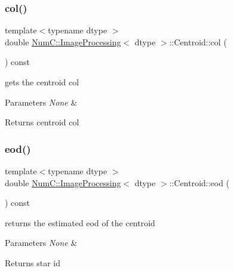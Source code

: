 \subsubsection{\texorpdfstring{col()}{col()}}
{\footnotesize\ttfamily template$<$typename dtype $>$ \\
double \mbox{\hyperlink{class_num_c_1_1_image_processing}{Num\+C\+::\+Image\+Processing}}$<$ dtype $>$\+::Centroid\+::col (\begin{DoxyParamCaption}{ }\end{DoxyParamCaption}) const\hspace{0.3cm}{\ttfamily [inline]}}

gets the centroid col


\begin{DoxyParams}{Parameters}
{\em None} & \\
\hline
\end{DoxyParams}
\begin{DoxyReturn}{Returns}
centroid col 
\end{DoxyReturn}
\mbox{\label{class_num_c_1_1_image_processing_1_1_centroid_ac5ac656c68e5c1419a4404d507eeee21}} 
\subsubsection{\texorpdfstring{eod()}{eod()}}
{\footnotesize\ttfamily template$<$typename dtype $>$ \\
double \mbox{\hyperlink{class_num_c_1_1_image_processing}{Num\+C\+::\+Image\+Processing}}$<$ dtype $>$\+::Centroid\+::eod (\begin{DoxyParamCaption}{ }\end{DoxyParamCaption}) const\hspace{0.3cm}{\ttfamily [inline]}}

returns the estimated eod of the centroid


\begin{DoxyParams}{Parameters}
{\em None} & \\
\hline
\end{DoxyParams}
\begin{DoxyReturn}{Returns}
star id 
\end{DoxyReturn}
\mbox{\label{class_num_c_1_1_image_processing_1_1_centroid_a973e81498b872c0a25b65728736ba6ab}} 

